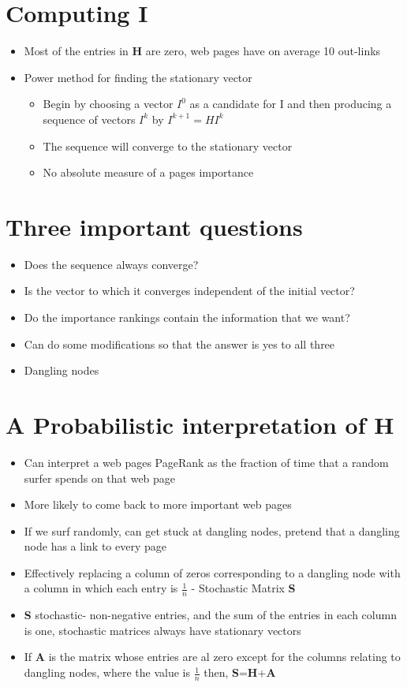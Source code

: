 \documentclass[11pt]{report}
\begin{document}
\section{Computing I}
\begin{itemize}
\item Most of the entries in \textbf{H} are zero, web pages have on average 10 out-links
\item Power method for finding the stationary vector
\begin{itemize}
\item Begin by choosing a vector $I^0$ as a candidate for I and then producing a sequence of vectors $I^k$ by $I^{k+1} = HI^k$
\item The sequence will converge to the stationary vector
\item No absolute measure of a pages importance
\end{itemize}
\end{itemize}
\section{Three important questions}
\begin{itemize}
\item Does the sequence always converge?
\item Is the vector to which it converges independent of the initial vector?
\item Do the importance rankings contain the information that we want?
\item Can do some modifications so that the answer is yes to all three
\item Dangling nodes
\end{itemize}
\section{A Probabilistic interpretation of H}
\begin{itemize}
\item Can interpret a web pages PageRank as the fraction of time that a random surfer spends on that web page
\item More likely to come back to more important web pages
\item If we surf randomly, can get stuck at dangling nodes, pretend that a dangling node has a link to every page 
\item Effectively replacing a column of zeros corresponding to a dangling node with a column in which each entry is $\frac{1}{n}$ - Stochastic Matrix \textbf{S}
\item \textbf{S} stochastic- non-negative entries, and the sum of the entries in each column is one, stochastic matrices always have stationary vectors
\item If \textbf{A} is the matrix whose entries are al zero except for the columns relating to dangling nodes, where the value is $\frac{1}{n}$ then, \textbf{S}=\textbf{H}+\textbf{A}
\end{itemize}
\end{document}

